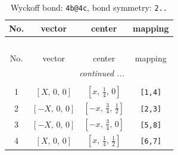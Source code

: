 \documentclass[fleqn,8pt]{jsarticle}
\begin{document}
\renewcommand{\arraystretch}{1.2}
\begin{longtable}{cccc}
\caption{Wyckoff bond: {\tt 4b@4c}, bond symmetry: {\tt 2..}}
 \\
 \hline \hline
No. & vector & center & mapping \\ \hline \endfirsthead

\multicolumn{3}{l}{\tablename\ \thetable{}} \\
 \hline \hline
No. & vector & center & mapping \\ \hline \endhead

 \hline \hline
\multicolumn{3}{r}{\footnotesize\it continued ...} \\ \endfoot

 \hline \hline
\multicolumn{3}{r}{} \\ \endlastfoot

1 & $\left[ X,\, 0,\, 0 \right]$ & $\left[ x,\, \frac{1}{4},\, 0 \right]$ & {\tt [1,4]} \\ \hline
2 & $\left[ - X,\, 0,\, 0 \right]$ & $\left[ - x,\, \frac{3}{4},\, \frac{1}{2} \right]$ & {\tt [2,3]} \\ \hline
3 & $\left[ - X,\, 0,\, 0 \right]$ & $\left[ - x,\, \frac{3}{4},\, 0 \right]$ & {\tt [5,8]} \\ \hline
4 & $\left[ X,\, 0,\, 0 \right]$ & $\left[ x,\, \frac{1}{4},\, \frac{1}{2} \right]$ & {\tt [6,7]} \\
\end{longtable}
\renewcommand{\arraystretch}{1.2}
\end{document}
